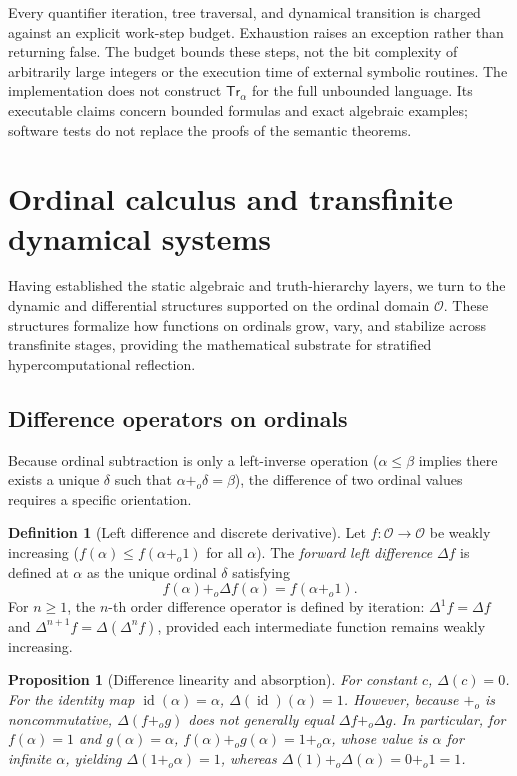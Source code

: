 \documentclass[11pt]{article}
\newtheorem{proposition}[theorem]{Proposition}
\theoremstyle{definition}
\newtheorem{definition}[theorem]{Definition}
\newcommand{\Ord}{\mathcal O}
\begin{document}
Every quantifier iteration, tree traversal, and dynamical transition is charged against an explicit work-step budget. Exhaustion raises an exception rather than returning false. The budget bounds these steps, not the bit complexity of arbitrarily large integers or the execution time of external symbolic routines. The implementation does not construct $\mathsf{Tr}_\alpha$ for the full unbounded language. Its executable claims concern bounded formulas and exact algebraic examples; software tests do not replace the proofs of the semantic theorems.

\section{Ordinal calculus and transfinite dynamical systems}
Having established the static algebraic and truth-hierarchy layers, we turn to the dynamic and differential structures supported on the ordinal domain $\Ord$. These structures formalize how functions on ordinals grow, vary, and stabilize across transfinite stages, providing the mathematical substrate for stratified hypercomputational reflection.

\subsection{Difference operators on ordinals}
Because ordinal subtraction is only a left-inverse operation ($\alpha \le \beta$ implies there exists a unique $\delta$ such that $\alpha +_o \delta = \beta$), the difference of two ordinal values requires a specific orientation.

\begin{definition}[Left difference and discrete derivative]
Let $f\colon \Ord \to \Ord$ be weakly increasing ($f(\alpha) \le f(\alpha +_o 1)$ for all $\alpha$). The \emph{forward left difference} $\Delta f$ is defined at $\alpha$ as the unique ordinal $\delta$ satisfying
\[
f(\alpha) +_o \Delta f(\alpha) = f(\alpha +_o 1).
\]
For $n \ge 1$, the $n$-th order difference operator is defined by iteration: $\Delta^1 f = \Delta f$ and $\Delta^{n+1} f = \Delta(\Delta^n f)$, provided each intermediate function remains weakly increasing.
\end{definition}

\begin{proposition}[Difference linearity and absorption]
For constant $c$, $\Delta(c) = 0$. For the identity map $\operatorname{id}(\alpha) = \alpha$, $\Delta(\operatorname{id})(\alpha) = 1$. However, because $+_o$ is noncommutative, $\Delta(f +_o g)$ does not generally equal $\Delta f +_o \Delta g$. In particular, for $f(\alpha) = 1$ and $g(\alpha) = \alpha$, $f(\alpha) +_o g(\alpha) = 1 +_o \alpha$, whose value is $\alpha$ for infinite $\alpha$, yielding $\Delta(1 +_o \alpha) = 1$, whereas $\Delta(1) +_o \Delta(\alpha) = 0 +_o 1 = 1$.
\end{proposition}
\end{document}
